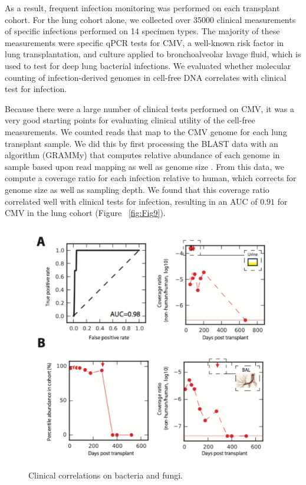 As a result, frequent infection monitoring was performed on each transplant cohort. For the lung cohort alone, we collected over 35000 clinical measurements of specific infections performed on 14 specimen types. The majority of these measurements were specific qPCR tests for CMV, a well-known risk factor in lung transplantation, and culture applied to bronchoalveolar lavage fluid, which is used to test for deep lung bacterial infections. We evaluated whether molecular counting of infection-derived genomes in cell-free DNA correlates with clinical test for infection. 

Because there were a large number of clinical tests performed on CMV, it was a very good starting points for evaluating clinical utility of the cell-free measurements. We counted reads that map to the CMV genome for each lung transplant sample. We did this by first processing the BLAST data with an algorithm (GRAMMy) that computes relative abundance of each genome in sample based upon read mapping as well as genome size \cite{Xia:2011it}. From this data, we compute a coverage ratio for each infection relative to human, which corrects for genome size as well as sampling depth. We found that this coverage ratio correlated well with clinical tests for infection, resulting in an AUC of $0.91$ for CMV in the lung cohort (Figure ~\ref{fig:Fig9}). 

\begin{figure}
\center\includegraphics[width=150mm,scale=0.5]{Figures/Fig9_1}
\caption{Clinical correlations on bacteria and fungi.}
\label{fig:Fig9_1}
\end{figure}

